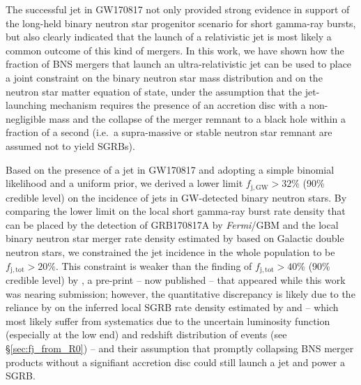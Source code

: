 \documentclass[]{aa}
\newcommand{\resp}[1]{#1}
\begin{document}

The successful jet in GW170817 not only provided \resp{strong evidence in support} of the long-held binary neutron star progenitor scenario for short gamma-ray bursts, but also clearly indicated that \resp{the launch of a relativistic jet} is  most likely a common outcome of this kind of mergers. In this work, we have shown how the fraction of BNS mergers that launch an ultra-relativistic jet can be used to place a joint constraint on the binary neutron star mass distribution and on the neutron star matter equation of state, under the assumption that the jet-launching mechanism requires the presence of an accretion disc with a non-negligible mass and the collapse of the merger remnant to a black hole within a fraction of a second (i.e.~a supra-massive or stable neutron star remnant are assumed not to yield SGRBs). 

Based on the presence of a jet in GW170817 and adopting a simple binomial likelihood and a uniform prior, we derived a lower limit $f_\mathrm{j,GW}>32\%$ (90\% credible level) on the \resp{incidence} of jets in GW-detected binary neutron stars. By comparing the lower limit on the local short gamma-ray burst rate density that can be placed by the detection of GRB170817A by \textit{Fermi}/GBM and the local binary neutron star merger rate density estimated by \citet{Grunthal2021} based on Galactic double neutron stars, we constrained the jet \resp{incidence} in the whole population to be $f_\mathrm{j,tot}>20\%$.  This constraint is weaker than the finding of $f_\mathrm{j,tot}> 40\%$ (90\% credible level) by \citet{Sarin2022}, a pre-print \resp{-- now published --}  that appeared while this work was nearing submission; however, the quantitative discrepancy is likely due to the reliance by \citet{Sarin2022} on the inferred local SGRB rate density estimated by \citet{Coward2012} and \citet{Wanderman2015} -- which most likely suffer from systematics due to the uncertain luminosity function (especially at the low end) and redshift distribution of events (see \S\ref{sec:fj_from_R0}) -- and their assumption that promptly collapsing BNS merger products without a signifiant accretion disc could still launch a jet and power a SGRB.
\end{document}

